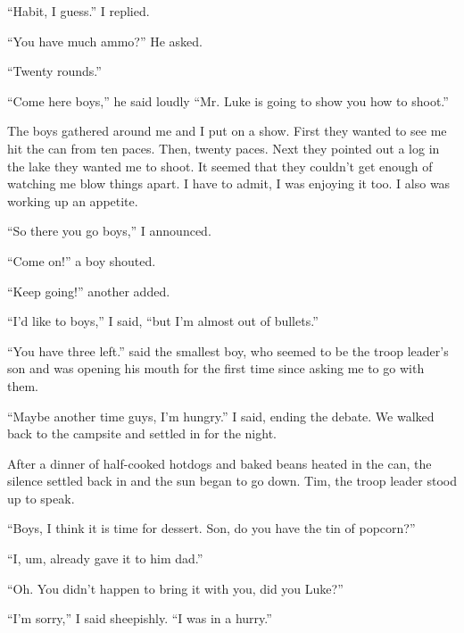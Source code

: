 ``Habit, I guess.'' I replied.



``You have much ammo?'' He asked.



``Twenty rounds.''



``Come here boys,'' he said loudly ``Mr. Luke is going to show you how
to shoot.''



The boys gathered around me and I put on a show. First they wanted
to see me hit the can from ten paces. Then, twenty paces. Next they
pointed out a log in the lake they wanted me to shoot. It seemed
that they couldn't get enough of watching me blow things apart. I
have to admit, I was enjoying it too. I also was working up an
appetite.



``So there you go boys,'' I announced.



``Come on!'' a boy shouted.



``Keep going!'' another added.



``I'd like to boys,'' I said, ``but I'm almost out of bullets.''



``You have three left.'' said the smallest boy, who seemed to be the
troop leader's son and was opening his mouth for the first time
since asking me to go with them.



``Maybe another time guys, I'm hungry.'' I said, ending the debate.
We walked back to the campsite and settled in for the night.



After a dinner of half-cooked hotdogs and baked beans heated in the
can, the silence settled back in and the sun began to go down. Tim,
the troop leader stood up to speak.



``Boys, I think it is time for dessert. Son, do you have the tin of
popcorn?''



``I, um, already gave it to him dad.''



``Oh. You didn't happen to bring it with you, did you Luke?''



``I'm sorry,'' I said sheepishly. ``I was in a hurry.''




